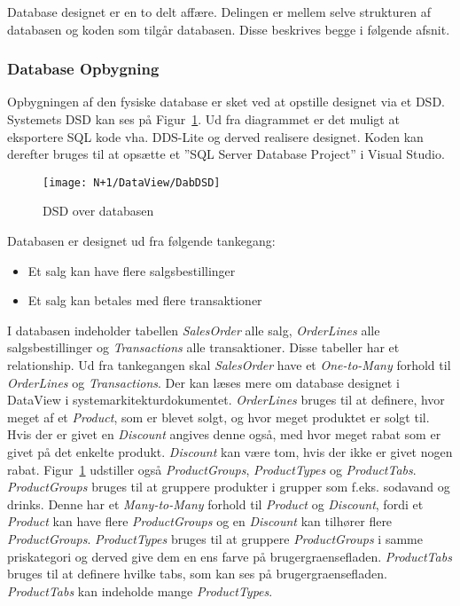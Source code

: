 Database designet er en to delt affære. Delingen er mellem selve strukturen af databasen og koden som tilgår databasen.
Disse beskrives begge i følgende afsnit.

\subsubsection{Database Opbygning}
Opbygningen af den fysiske database er sket ved at opstille designet via et \gls{DSD}. Systemets \gls{DSD}  kan ses på Figur~\ref{fig:DSD}. Ud fra diagrammet er det muligt at eksportere SQL kode vha. \gls{DDS-Lite} og derved realisere designet. Koden kan derefter bruges til at opsætte et ''SQL Server Database Project'' i Visual Studio. 

\begin{figure}[H]
    \centering
    \texttt{[image: N+1/DataView/DabDSD]}
    \caption{\gls{DSD} over databasen}
    \label{fig:DSD}
\end{figure}

Databasen er designet ud fra følgende tankegang:
\begin{itemize}
	\item Et salg kan have flere salgsbestillinger
	\item Et salg kan betales med flere transaktioner
\end{itemize}
I databasen indeholder tabellen \textit{SalesOrder} alle salg, \textit{OrderLines} alle salgsbestillinger og \textit{Transactions} alle transaktioner. Disse tabeller har et relationship. Ud fra tankegangen skal \textit{SalesOrder} have et \textit{One-to-Many} forhold til \textit{OrderLines} og \textit{Transactions}. Der kan læses mere om database designet i DataView i systemarkitekturdokumentet.
\newline\newline
\textit{OrderLines} bruges til at definere, hvor meget af et \textit{Product}, som er blevet solgt, og hvor meget produktet er solgt til. Hvis der er givet en \textit{Discount} angives denne også, med hvor meget rabat som er givet på det enkelte produkt. \textit{Discount} kan være tom, hvis der ikke er givet nogen rabat.
\newline\newline
Figur~\ref{fig:DSD} udstiller også \textit{ProductGroups}, \textit{ProductTypes} og \textit{ProductTabs}. \textit{ProductGroups} bruges til at gruppere produkter i grupper som f.eks. sodavand og drinks. Denne har et \textit{Many-to-Many} forhold til \textit{Product} og \textit{Discount}, fordi et \textit{Product} kan have flere \textit{ProductGroups} og en \textit{Discount} kan tilhører flere \textit{ProductGroups}. \textit{ProductTypes} bruges til at gruppere \textit{ProductGroups} i samme priskategori og derved give dem en ens farve på \gls{brugergraenseflade}n. \textit{ProductTabs} bruges til at definere hvilke tabs, som kan ses på \gls{brugergraenseflade}n. \textit{ProductTabs} kan indeholde mange \textit{ProductTypes}.

